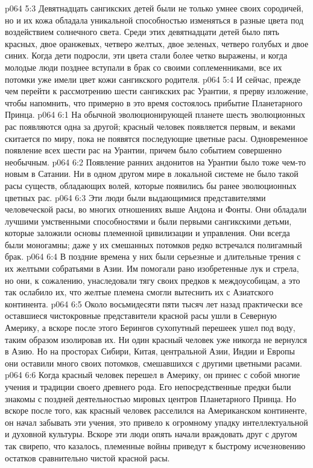 \vs p064 5:3 Девятнадцать сангикских детей были не только умнее своих сородичей, но и их кожа обладала уникальной способностью изменяться в разные цвета под воздействием солнечного света. Среди этих девятнадцати детей было пять красных, двое оранжевых, четверо желтых, двое зеленых, четверо голубых и двое синих. Когда дети подросли, эти цвета стали более четко выражены, и когда молодые люди позднее вступали в брак со своими соплеменниками, все их потомки уже имели цвет кожи сангикского родителя.
\vs p064 5:4 И сейчас, прежде чем перейти к рассмотрению шести сангикских рас Урантии, я прерву изложение, чтобы напомнить, что примерно в это время состоялось прибытие Планетарного Принца.
\vs p064 6:1 На обычной эволюционирующей планете шесть эволюционных рас появляются одна за другой; красный человек появляется первым, и веками скитается по миру, пока не появятся последующие цветные расы. Одновременное появление всех шести рас на Урантии, причем  было событием совершенно необычным.
\vs p064 6:2 Появление ранних андонитов на Урантии было тоже чем\hyp{}то новым в Сатании. Ни в одном другом мире в локальной системе не было такой расы существ, обладающих волей, которые появились бы ранее эволюционных цветных рас.
\vs p064 6:3 \bibnobreakspace {} Эти люди были выдающимися представителями человеческой расы, во многих отношениях выше Андона и Фонты. Они обладали лучшими умственными способностями и были первыми сангикскими детьми, которые заложили основы племенной цивилизации и управления. Они всегда были моногамны; даже у их смешанных потомков редко встречался полигамный брак.
\vs p064 6:4 В поздние времена у них были серьезные и длительные трения с их желтыми собратьями в Азии. Им помогали рано изобретенные лук и стрела, но они, к сожалению, унаследовали тягу своих предков к междоусобицам, а это так ослабило их, что желтые племена смогли вытеснить их с Азиатского континента.
\vs p064 6:5 Около восьмидесяти пяти тысяч лет назад практически все оставшиеся чистокровные представители красной расы ушли в Северную Америку, а вскоре после этого Берингов сухопутный перешеек ушел под воду, таким образом изолировав их. Ни один красный человек уже никогда не вернулся в Азию. Но на просторах Сибири, Китая, центральной Азии, Индии и Европы они оставили много своих потомков, смешавшихся с другими цветными расами.
\vs p064 6:6 Когда красный человек перешел в Америку, он принес с собой многие учения и традиции своего древнего рода. Его непосредственные предки были знакомы с поздней деятельностью мировых центров Планетарного Принца. Но вскоре после того, как красный человек расселился на Американском континенте, он начал забывать эти учения, это привело к огромному упадку интеллектуальной и духовной культуры. Вскоре эти люди опять начали враждовать друг с другом так свирепо, что казалось, племенные войны приведут к быстрому исчезновению остатков сравнительно чистой красной расы.
